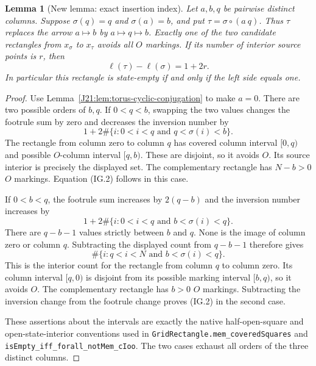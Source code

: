 \documentclass[11pt,oneside]{report}
\newtheorem{lemma}[theorem]{Lemma}
\theoremstyle{definition}
\numberwithin{equation}{section}
\newcommand{\decl}[1]{\textnormal{\nolinkurl{#1}}}
\begin{document}
\begin{lemma}[New lemma: exact insertion index]
\label{J21:lem:torus-exact-insertion-index}
Let $a,b,q$ be pairwise distinct columns. Suppose
$\sigma(q)=q$ and $\sigma(a)=b$, and put
$\tau=\sigma\circ(a\ q)$. Thus $\tau$ replaces the arrow
$a\mapsto b$ by $a\mapsto q\mapsto b$.
Exactly one of the two candidate rectangles from $x_\sigma$ to
$x_\tau$ avoids all $O$ markings. If its number of interior source
points is $r$, then
\[
                         \ell(\tau)-\ell(\sigma)=1+2r.
 \tag{IG.2}
\]
In particular this rectangle is state-empty if and only if the
left side equals one.
\end{lemma}
\begin{proof}
Use Lemma~\ref{J21:lem:torus-cyclic-conjugation} to make $a=0$.
There are two possible orders of $b,q$.
If $0<q<b$, swapping the two values changes the footrule sum by
zero and decreases the inversion number by
\[
             1+2\#\{i:0<i<q\text{ and }q<\sigma(i)<b\}.
\]
The rectangle from column zero to column $q$ has covered column
interval $[0,q)$ and possible $O$-column interval $[q,b)$.
These are disjoint, so it avoids $O$.
Its source interior is precisely the displayed set.
The complementary rectangle has $N-b>0$ $O$ markings.
Equation (IG.2) follows in this case.

If $0<b<q$, the footrule sum increases by $2(q-b)$ and the
inversion number increases by
\[
             1+2\#\{i:0<i<q\text{ and }b<\sigma(i)<q\}.
\]
There are $q-b-1$ values strictly between $b$ and $q$.
None is the image of column zero or column $q$.
Subtracting the displayed count from $q-b-1$ therefore gives
\[
                     \#\{i:q<i<N\text{ and }b<\sigma(i)<q\}.
\]
This is the interior count for the rectangle from column $q$ to
column zero. Its column interval $[q,0)$ is disjoint from its
possible marking interval $[b,q)$, so it avoids $O$.
The complementary rectangle has $b>0$ $O$ markings.
Subtracting the inversion change from the footrule change proves
(IG.2) in the second case.

These assertions about the intervals are exactly the native
half-open-square and open-state-interior conventions used in
\decl{GridRectangle.mem_coveredSquares} and
\decl{isEmpty_iff_forall_notMem_cIoo}. The two cases exhaust all
orders of the three distinct columns.
\end{proof}
\end{document}
